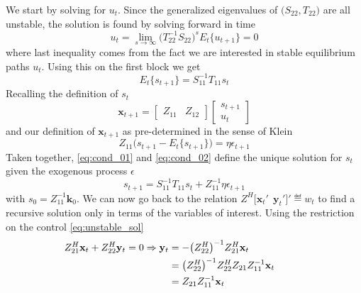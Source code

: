 \documentclass[a4paper,10pt]{article}  %
\begin{document}
We start by solving for $u_t$. Since the generalized eigenvalues of  $ \big( S_{22}, T_{22} \big) $ are all
unstable, the solution is found by solving forward in time
\begin{equation}
   \label{eq:unstable_sol}
   u_t = \lim_{s \rightarrow \infty }\big( T_{22}^{-1} S_{22} \big)^{s} E_t\{ u_{t+1} \} = 0
\end{equation}
where last inequality comes from the fact we are interested in stable equilibrium paths $ u_t $. 
Using this on the first block we get
\begin{equation}
   \label{eq:cond_01}
   E_t\big\{ s_{t+1} \big\}  = S_{11}^{-1} T_{11} s_t
\end{equation}
Recalling the definition of $ s_t $
\begin{equation*}
   \mathbf{x}_{t+1} = 
      \begin{bmatrix}
         Z_{11} & Z_{12}
      \end{bmatrix} 
      \begin{bmatrix}
         s_{t+1} \\ u_{t}
      \end{bmatrix}
\end{equation*}
and our definition of $ \mathbf{x}_{t+1} $ as pre-determined in the sense of Klein
\begin{equation}
   \label{eq:cond_02}
   Z_{11} \Big( s_{t+1} -  E_t\{ s_{t+1} \}\Big) = \eta \epsilon_{t+1}
\end{equation}
Taken together, \eqref{eq:cond_01} and \eqref{eq:cond_02} define the unique solution for $ s_t $ given the exogenous process $ \epsilon $
\begin{equation}
   \label{eq:stable_sol}
   s_{t+1} = S_{11}^{-1} T_{11} s_t + Z_{11}^{-1} \eta \epsilon_{t+1}
\end{equation}
with $ s_0 = Z_{11}^{-1} \mathbf{k}_0 $. We can now go back to the relation $ Z^H \Big[\mathbf{x}_t' \ \
\mathbf{y}_t'\Big]' \eqdef w_t$ to find a recursive solution only in terms of the variables of interest. Using the
restriction on the control \eqref{eq:unstable_sol}
\begin{align*}
   Z^H_{21} \mathbf{x}_t + Z^H_{22} \mathbf{y}_t = 0 \Rightarrow \mathbf{y}_t & = - \big( Z^H_{22} \big)^{-1} Z^{H}_{21} \mathbf{x}_t 
   & \quad \quad & \notag \\
   & = \big( Z^H_{22} \big)^{-1} Z^H_{22} Z_{21} Z_{11}^{-1} \mathbf{x}_t \notag \\
   & = Z_{21} Z_{11}^{-1} \mathbf{x}_t
\end{align*}
\end{document}
